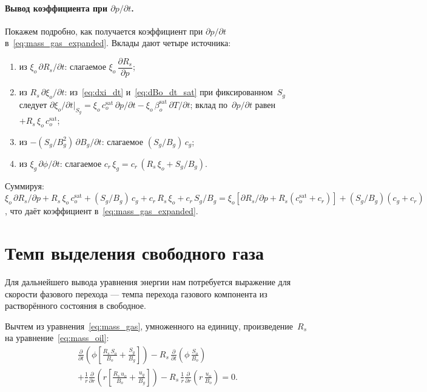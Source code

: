 \documentclass[12pt,a4paper]{article}
\begin{document}
\paragraph{Вывод коэффициента при $\partial p/\partial t$.}
Покажем подробно, как получается коэффициент при $\partial p/\partial t$
в~\eqref{eq:mass_gas_expanded}. Вклады дают четыре источника:
\begin{enumerate}[nosep]
  \item из $\xi_o\,\partial R_s/\partial t$: слагаемое
    $\xi_o\,\dfrac{\partial R_s}{\partial p}$;
  \item из $R_s\,\partial\xi_o/\partial t$:
    из~\eqref{eq:dxi_dt} и~\eqref{eq:dBo_dt_sat} при
    фиксированном~$S_g$ следует
    $\partial\xi_o/\partial t\big|_{S_g} =
    \xi_o\,c_o^{\mathrm{sat}}\,\partial p/\partial t
    - \xi_o\,\beta_o^{\mathrm{sat}}\,\partial T/\partial t$;
    вклад по~$\partial p/\partial t$ равен $+R_s\,\xi_o\,c_o^{\mathrm{sat}}$;
  \item из $-(S_g/B_g^2)\,\partial B_g/\partial t$: слагаемое
    $(S_g/B_g)\,c_g$;
  \item из $\xi_g\,\partial\phi/\partial t$: слагаемое $c_r\,\xi_g
    = c_r\,(R_s\,\xi_o + S_g/B_g)$.
\end{enumerate}
Суммируя: $\xi_o\,\partial R_s/\partial p + R_s\,\xi_o\,c_o^{\mathrm{sat}}
+ (S_g/B_g)\,c_g + c_r\,R_s\,\xi_o + c_r\,S_g/B_g
= \xi_o[\partial R_s/\partial p + R_s(c_o^{\mathrm{sat}} + c_r)]
+ (S_g/B_g)(c_g + c_r)$, что даёт коэффициент
в~\eqref{eq:mass_gas_expanded}.


\section{Темп выделения свободного газа}\label{sec:degas_rate}

Для дальнейшего вывода уравнения энергии нам потребуется выражение для
скорости фазового перехода --- темпа перехода газового компонента из
растворённого состояния в свободное.

Вычтем из уравнения~\eqref{eq:mass_gas}, умноженного на единицу,
произведение~$R_s$ на уравнение~\eqref{eq:mass_oil}:
\begin{multline*}
  \frac{\partial}{\partial t}\!\left(\phi\!\left[
    \frac{R_s\,S_o}{B_o} + \frac{S_g}{B_g}
  \right]\right)
  - R_s\,\frac{\partial}{\partial t}\!\left(\phi\,\frac{S_o}{B_o}\right)
  \\
  + \frac{1}{r}\frac{\partial}{\partial r}\!\left(r\!\left[
    \frac{R_s\,u_o}{B_o} + \frac{u_g}{B_g}
  \right]\right)
  - R_s\,\frac{1}{r}\frac{\partial}{\partial r}\!
    \left(r\,\frac{u_o}{B_o}\right) = 0.
\end{multline*}
\end{document}
